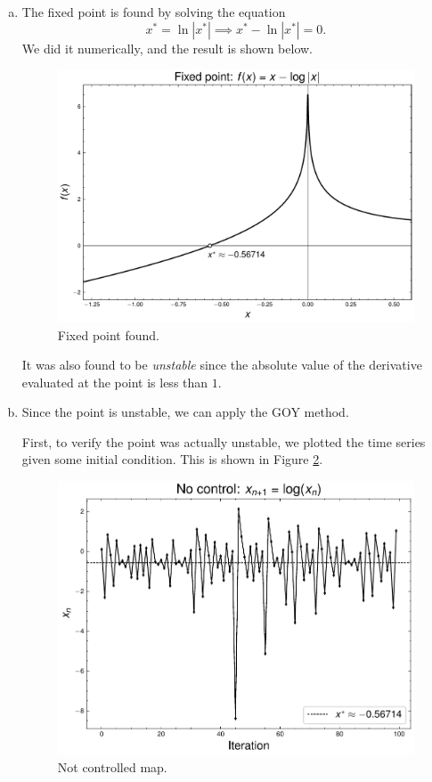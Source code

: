 \begin{enumerate}[(a)]
    \item The fixed point is found by solving the equation
    \[
    x^*=\ln|x^*| \implies x^* - \ln|x^*| = 0.
    \]
    We did it numerically, and the result is shown below.

    \begin{figure}[!ht]
        \centering
        \includegraphics[scale=0.70]{images/fixed_point.pdf}
        \caption{Fixed point found.}
        \label{fig:4b}
    \end{figure}

    \newpage
    It was also found to be \textit{unstable} since the absolute value
    of the derivative evaluated at the point is less than $1$.

    \item Since the point is unstable, we can apply the GOY method. 
    
    First, to verify the point was actually unstable, we plotted the time series
    given some initial condition. This is shown in Figure \ref{fig:5ba}.

    \begin{figure}[!ht]
        \centering
        \includegraphics[scale=0.70]{images/no_control_log.pdf}
        \caption{Not controlled map.}
        \label{fig:5ba}
    \end{figure}


\end{enumerate}

